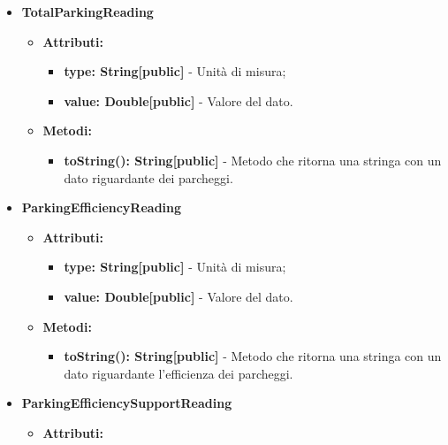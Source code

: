 \documentclass[8pt]{article}
\begin{document}
\begin{itemize}
\begin{itemize}
\begin{itemize}
        \end{itemize}
    \end{itemize}
    \item \textbf{TotalParkingReading}
    \begin{itemize}
        \item \textbf{Attributi:}
        \begin{itemize}
            \item \textbf{type: String[public]} - Unità di misura;
            \item \textbf{value: Double[public]} - Valore del dato.
        \end{itemize}
    \end{itemize}
    \begin{itemize}
        \item \textbf{Metodi:}
        \begin{itemize}
            \item \textbf{toString(): String[public]} - Metodo che ritorna una stringa con un dato riguardante dei parcheggi.
        \end{itemize}
    \end{itemize}
    \item \textbf{ParkingEfficiencyReading}
    \begin{itemize}
        \item \textbf{Attributi:}
        \begin{itemize}
            \item \textbf{type: String[public]} - Unità di misura;
            \item \textbf{value: Double[public]} - Valore del dato.
        \end{itemize}
    \end{itemize}
    \begin{itemize}
        \item \textbf{Metodi:}
        \begin{itemize}
            \item \textbf{toString(): String[public]} - Metodo che ritorna una stringa con un dato riguardante l'efficienza dei parcheggi.
        \end{itemize}
    \end{itemize}
    \item \textbf{ParkingEfficiencySupportReading}
    \begin{itemize}
        \item \textbf{Attributi:}
        \begin{itemize}

\end{itemize}
\end{itemize}
\end{itemize}
\end{document}

